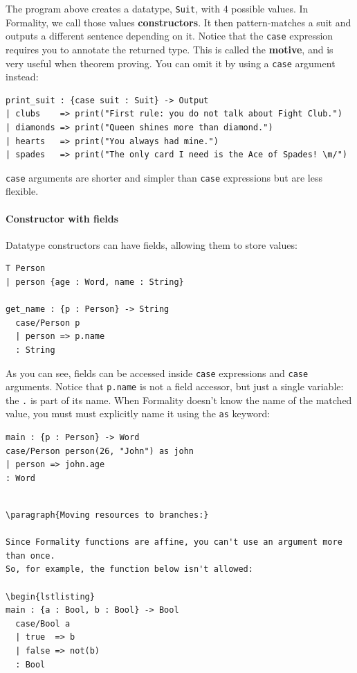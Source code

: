 \documentclass{article}
\theoremstyle{definition}
\theoremstyle{theorem}
\begin{document}
The program above creates a datatype, \verb|Suit|, with 4 possible values. In
Formality, we call those values \textbf{constructors}. It then pattern-matches a
suit and outputs a different sentence depending on it. Notice that the \verb|case|
expression requires you to annotate the returned type. This is called the
\textbf{motive}, and is very useful when theorem proving. You can omit it by
using a \verb|case| argument instead:

\begin{lstlisting}
print_suit : {case suit : Suit} -> Output
| clubs    => print("First rule: you do not talk about Fight Club.")
| diamonds => print("Queen shines more than diamond.")
| hearts   => print("You always had mine.")
| spades   => print("The only card I need is the Ace of Spades! \m/")
\end{lstlisting}

\verb|case| arguments are shorter and simpler than \verb|case| expressions
but are less flexible.

\paragraph{Constructor with fields}

Datatype constructors can have fields, allowing them to store values:

\begin{lstlisting}
T Person
| person {age : Word, name : String}

get_name : {p : Person} -> String
  case/Person p
  | person => p.name
  : String
\end{lstlisting}

As you can see, fields can be accessed inside \verb|case| expressions and
\verb|case| arguments. Notice that \verb|p.name| is not a field accessor, but
just a single variable: the \verb|.| is part of its name. When Formality doesn't
know the name of the matched value, you must must explicitly name it using the
\verb|as| keyword:

\begin{lstlisting}
main : {p : Person} -> Word
case/Person person(26, "John") as john
| person => john.age
: Word
\end{lstlisting}
\begin{lstlisting}

\paragraph{Moving resources to branches:}

Since Formality functions are affine, you can't use an argument more than once.
So, for example, the function below isn't allowed:

\begin{lstlisting}
main : {a : Bool, b : Bool} -> Bool
  case/Bool a
  | true  => b
  | false => not(b)
  : Bool
\end{lstlisting}
\end{document}
